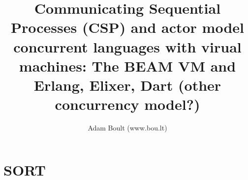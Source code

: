 \documentclass[oneside]{book}
\begin{document}
\author{Adam Boult (www.bou.lt)}
\title{Communicating Sequential Processes (CSP) and actor model concurrent languages with virual machines: The BEAM VM and Erlang, Elixer, Dart (other concurrency model?)}
\maketitle

\setcounter{tocdepth}{0}
\tableofcontents



\part{SORT}

\end{document}
